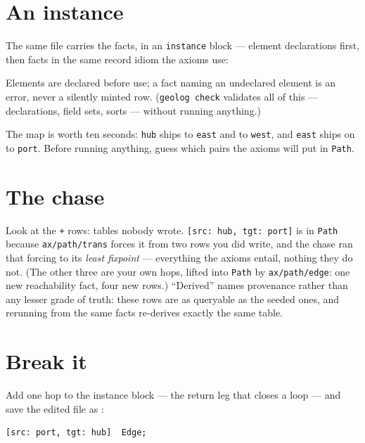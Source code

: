 \section{An instance}
\label{sec:gqs-instance}

The same file carries the facts, in an \texttt{instance} block ---
element declarations first, then facts in the same record idiom the
axioms use:



\noindent Elements are declared before use; a fact naming an
undeclared element is an error, never a silently minted row.
(\texttt{geolog check} validates all of this --- declarations, field
sets, sorts --- without running anything.)

The map is worth ten seconds: \texttt{hub} ships to \texttt{east}
and to \texttt{west}, and \texttt{east} ships on to \texttt{port}.
Before running anything, guess which pairs the axioms will put in
\texttt{Path}.

\section{The chase}
\label{sec:gqs-chase}



Look at the \texttt{+} rows: tables nobody wrote.
\texttt{[src: hub, tgt: port]} is in \texttt{Path} because
\texttt{ax/path/trans} forces it from two rows you did write, and the
chase ran that forcing to its \emph{least fixpoint} --- everything the
axioms entail, nothing they do not. (The other three are your own
hops, lifted into \texttt{Path} by \texttt{ax/path/edge}: one new
reachability fact, four new rows.) ``Derived'' names provenance
rather than any lesser grade of truth: these rows are as queryable
as the seeded ones, and rerunning from the same facts re-derives
exactly the same table.

\section{Break it}
\label{sec:gqs-break}

Add one hop to the instance block --- the return leg that closes a
loop --- and save the edited file as :

\begin{Verbatim}[fontsize=\small,frame=leftline,rulecolor=\color{accentmid},framesep=3mm,xleftmargin=3mm]
  [src: port, tgt: hub]  Edge;
\end{Verbatim}

